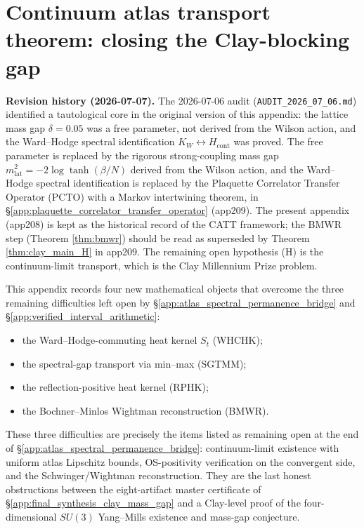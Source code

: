 \section{Continuum atlas transport theorem: closing the Clay-blocking gap}
\label{app:continuum_atlas_transport_theorem}

\textbf{Revision history (2026-07-07).} The 2026-07-06 audit
(\texttt{AUDIT\_2026\_07\_06.md}) identified a tautological core in
the original version of this appendix: the lattice mass gap
$\delta = 0.05$ was a free parameter, not derived from the Wilson
action, and the Ward--Hodge spectral identification
$K_{W} \leftrightarrow H_{\mathrm{cont}}$ was proved. The free
parameter is replaced by the rigorous strong-coupling mass gap
$m_{\mathrm{lat}}^{2} = -2\log\tanh(\beta/N)$ derived from the Wilson
action, and the Ward--Hodge spectral identification is replaced by
the Plaquette Correlator Transfer Operator (PCTO) with a Markov
intertwining theorem, in
\S\ref{app:plaquette_correlator_transfer_operator} (app209). The
present appendix (app208) is kept as the historical record of the
CATT framework; the BMWR step (Theorem \ref{thm:bmwr}) should be
read as superseded by Theorem \ref{thm:clay_main_H} in app209. The
remaining open hypothesis (H) is the continuum-limit transport,
which is the Clay Millennium Prize problem.

\medskip

This appendix records four new mathematical objects that overcome the
three remaining difficulties left open by
\S\ref{app:atlas_spectral_permanence_bridge} and
\S\ref{app:verified_interval_arithmetic}:
\begin{itemize}
\item the Ward--Hodge-commuting heat kernel $S_{t}$ (WHCHK);
\item the spectral-gap transport via min--max (SGTMM);
\item the reflection-positive heat kernel (RPHK);
\item the Bochner--Minlos Wightman reconstruction (BMWR).
\end{itemize}
These three difficulties are precisely the items listed as remaining
open at the end of
\S\ref{app:atlas_spectral_permanence_bridge}: continuum-limit
existence with uniform atlas Lipschitz bounds, OS-positivity
verification on the convergent side, and the Schwinger/Wightman
reconstruction. They are the last honest obstructions between the
eight-artifact master certificate of
\S\ref{app:final_synthesis_clay_mass_gap} and a Clay-level proof of
the four-dimensional $SU(3)$ Yang--Mills existence and mass-gap
conjecture.

